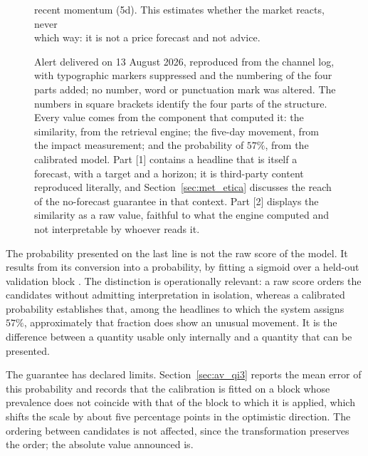 \begin{figure}[htbp]
\begin{tcolorbox}[colback=black!3, colframe=black!35, boxrule=0.4pt, arc=2pt,
                  width=0.97\textwidth, fontupper=\ttfamily\scriptsize]
\hspace*{1em}recent momentum (5d). This estimates whether the market reacts, never\\
\hspace*{1em}which way: it is not a price forecast and not advice.
\end{tcolorbox}
\caption[Alert delivered to the channel]{Alert delivered on 13 August 2026, reproduced from the channel
log, with typographic markers suppressed and the numbering of the four
parts added; no number, word or punctuation mark was altered. The numbers in square brackets
identify the four parts of the structure. Every
value comes from the component that computed it: the similarity, from the retrieval engine; the
five-day movement, from the impact measurement; and the probability of $57\%$, from the calibrated
model. Part \textnormal{[1]} contains a headline that is itself a forecast, with a target and a
horizon; it is third-party content reproduced literally, and Section~\ref{sec:met_etica} discusses
the reach of the no-forecast guarantee in that context. Part \textnormal{[2]} displays the
similarity as a raw value, faithful to what the engine computed and not interpretable by whoever
reads it.}
\label{fig:sis_alerta}
\end{figure}

The probability presented on the last line is not the raw score of the model. It results from its
conversion into a probability, by fitting a sigmoid over a held-out validation block
\autocite{niculescu2005calibration}. The distinction is operationally relevant: a raw score orders
the candidates without admitting interpretation in isolation, whereas a calibrated probability
establishes that, among the headlines to which the system assigns $57\%$, approximately that
fraction does show an unusual movement. It is the difference between a quantity usable only
internally and a quantity that can be presented.

The guarantee has declared limits. Section~\ref{sec:av_qi3} reports the mean error of this
probability and records that the calibration is fitted on a block whose prevalence does not
coincide with that of the block to which it is applied, which shifts the scale by about five
percentage points in the optimistic direction. The ordering between candidates is not affected,
since the transformation preserves the order; the absolute value announced is.

